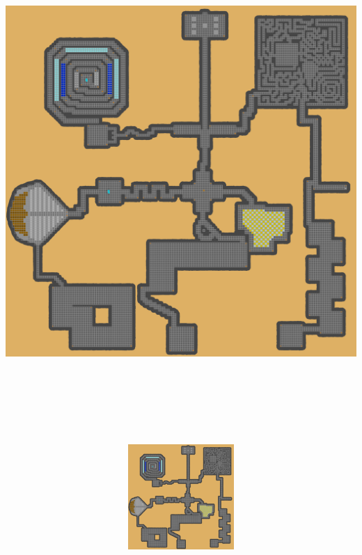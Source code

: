 \documentclass[a4paper, landscape]{article}
\begin{document}
\includegraphics[trim = 3457 3701 760 749, clip, height = 19cm, width = 28cm]{Dungeon_playersmap.png}
\clearpage
	\begin{figure}[H]
\includegraphics[trim = 3457 3571 760 1364, clip, height = 4cm, width = 28cm]{Dungeon_playersmap.png}
	\end{figure}
\end{document}

